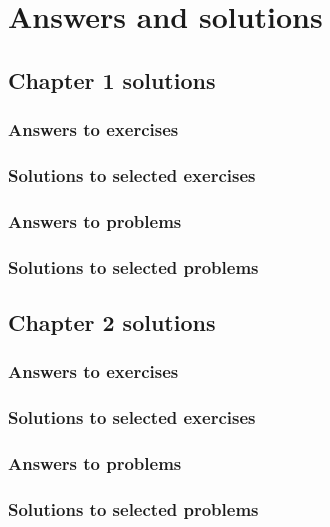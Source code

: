 
\chapter{Answers and solutions}
\label{appendix:ans_and_solutions}


\setlength\partopsep{-0.5\topsep}   %


	\section*{Chapter 1 solutions}
	\label{sec:chapter1sols}	
	{ \footnotesize 

		\subsection*{Answers to exercises}
		

		\subsection*{Solutions to selected exercises}
		
		
		\subsection*{Answers to problems}
		

		\subsection*{Solutions to selected problems}
		

	}  

	\section*{Chapter 2 solutions}
	\label{sec:chapter1sols}	
	{ \footnotesize 

		\subsection*{Answers to exercises}
		

		\subsection*{Solutions to selected exercises}
		
		
		\subsection*{Answers to problems}
		

		\subsection*{Solutions to selected problems}
		

	}  


